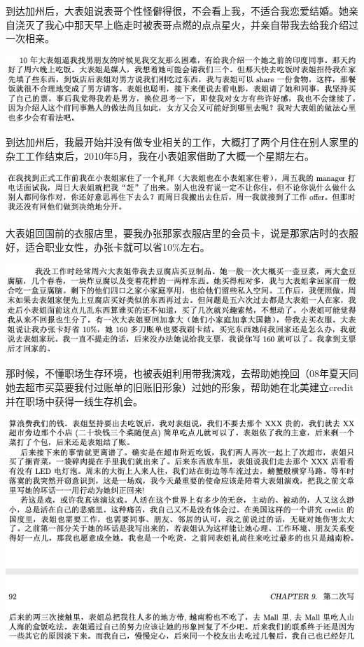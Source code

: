 \documentclass[9pt, b5paper]{article}
\begin{document}
到达加州后，大表姐说表哥个性怪僻得很，不会看上我，不适合我恋爱结婚。她亲自浇灭了我心中那天早上临走时被表哥点燃的点点星火，并亲自带我去给我介绍过一次相亲。

\begin{center}
\includegraphics[width=.9\linewidth]{./pic/p1p123.png}
\end{center}

到达加州后，我最开始并没有做专业相关的工作，大概打了两个月住在别人家里的杂工工作结束后，2010年5月，我在小表姐家借助了大概一个星期左右。

\begin{center}
\includegraphics[width=.9\linewidth]{./pic/p1p47-3.png}
\end{center}

大表姐回国前的衣服店里，要我办张那家衣服店里的会员卡，说是那家店时的衣服好，适合职业女性，办张卡就可以省10\%左右。

\begin{center}
\includegraphics[width=.9\linewidth]{./pic/p1p48-3.png}
\end{center}

那时候，不懂职场生存环境，也被表姐利用带我演戏，去帮助她挽回（08年夏天同她去超市买菜要我付过账单的旧账旧形象）过她的形象，帮助她在北美建立credit并在职场中获得一线生存机会。 

\begin{center}
\includegraphics[width=.9\linewidth]{./pic/p1p92.png}
\end{center}
\end{document}
